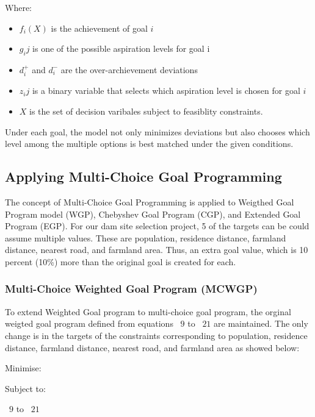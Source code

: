 Where:
\begin{itemize}
  \item $f_i(X)$ is the achievement of goal $i$
  \item $g_ij$ is one of the possible aspiration levels for goal i
  \item $d_i^+$ and $d_i^-$ are the over-archievement deviations
  \item $z_ij$ is a binary variable that selects which aspiration level is chosen for goal $i$
  \item $X$ is the set of decision varibales subject to feasiblity constraints.
\end{itemize}
Under each goal, the model not only minimizes deviations but also chooses which level among the multiple options is best matched under the given conditions.

\subsection{Applying Multi-Choice Goal Programming}

The concept of Multi-Choice Goal Programming is applied to Weigthed Goal Program model (WGP), Chebyshev Goal Program (CGP), and Extended Goal Program (EGP).
For our dam site selection project, 5 of the targets can be could assume multiple values. These are population, residence distance, farmland distance, nearest road, and farmland area. Thus, an extra goal value, which is 10 percent (10\%) more than the original goal is created for each.

\subsubsection{Multi-Choice Weighted Goal Program (MCWGP)}
To extend Weighted Goal program to multi-choice goal program, the orginal weigted goal program defined from equations ~$9$ to ~$21$ are maintained. The only change is in the targets of the constraints corresponding to population, residence distance, farmland distance, nearest road, and farmland area as showed below:

Minimise:
\EqDamWGPObjectiveEleven

Subject to:
        \EqMCWGPPopulationConstraintFourtyTwo   
        \EqMCWGPResidenceConstraintFourtyThree
        \EqMCWGPFarmlandDistanceConstraintFourtyFour
        \EqMCWGPNearestRoadConstraintFourtyFive
        \EqMCWGPFarmlandAreaConstraintFourtySix
        \begin{center}
               ~$9$ to ~$21$ 
        \end{center}


